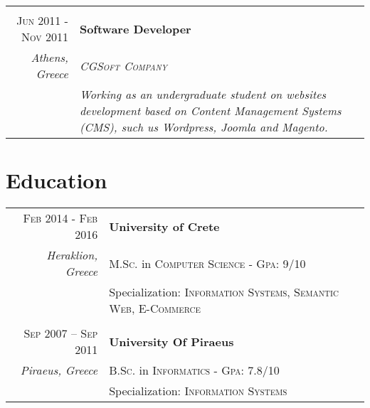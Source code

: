 \documentclass[11pt]{article}
\begin{document}
\begin{longtable}{r|p{12.5cm}}
\multicolumn{2}{c}{} \\
\textsc{Jun 2011 - Nov 2011} & \textbf{Software Developer} \\
\footnotesize{\textit{Athens, Greece}} & \emph{\textsc{CGSoft Company}} \\
& \footnotesize{\textit{Working as an undergraduate student on websites development based on Content Management Systems (CMS), such us Wordpress, Joomla and Magento.}} \\

\end{longtable}

\section{Education}

\begin{longtable}{r|p{12.5cm}}

\textsc{Feb 2014 - Feb 2016} & \textbf{University of Crete} \\
\footnotesize{\textit{Heraklion, Greece}} & \textsc{M.Sc.} in \textsc{Computer Science} - \textsc{Gpa}: 9/10\\
& Specialization: \textsc{Information Systems, Semantic Web, E-Commerce} \\

\multicolumn{2}{c}{} \\
\textsc{Sep 2007 – Sep 2011} & \textbf{University Of Piraeus} \\
\footnotesize{\textit{Piraeus, Greece}} & \textsc{B.Sc.} in \textsc{Informatics} - \textsc{Gpa}: 7.8/10 \\
& Specialization: \textsc{Information Systems} \\

\end{longtable}
\end{document}
